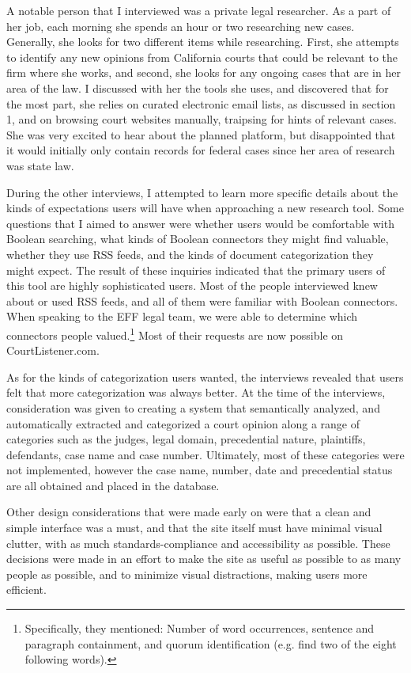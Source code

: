 A notable person that I interviewed was a private legal researcher. As a part of her job, each morning she spends an hour or two researching new cases. Generally, she looks for two different items while researching. First, she attempts to identify any new opinions from California courts that could be relevant to the firm where she works, and second, she looks for any ongoing cases that are in her area of the law. I discussed with her the tools she uses, and discovered that for the most part, she relies on curated electronic email lists, as discussed in section 1, and on browsing court websites manually, traipsing for hints of relevant cases. She was very excited to hear about the planned platform, but disappointed that it would initially only contain records for federal cases since her area of research was state law.

During the other interviews, I attempted to learn more specific details about the kinds of expectations users will have when approaching a new research tool. Some questions that I aimed to answer were whether users would be comfortable with Boolean searching, what kinds of Boolean connectors they might find valuable, whether they use RSS feeds, and the kinds of document categorization they might expect. The result of these inquiries indicated that the primary users of this tool are highly sophisticated users. Most of the people interviewed knew about or used RSS feeds, and all of them were familiar with Boolean connectors. When speaking to the EFF legal team, we were able to determine which connectors people valued.\footnote{Specifically, they mentioned: Number of word occurrences, sentence and paragraph containment, and quorum identification (e.g. find two of the eight following words).} Most of their requests are now possible on CourtListener.com.

As for the kinds of categorization users wanted, the interviews revealed that users felt that more categorization was always better. At the time of the interviews, consideration was given to creating a system that semantically analyzed, and automatically extracted and categorized a court opinion along a range of categories such as the judges, legal domain, precedential nature, plaintiffs, defendants, case name and case number. Ultimately, most of these categories were not implemented, however the case name, number, date and precedential status are all obtained and placed in the database.

Other design considerations that were made early on were that a clean and simple interface was a must, and that the site itself must have minimal visual clutter, with as much standards-compliance and accessibility as possible. These decisions were made in an effort to make the site as useful as possible to as many people as possible, and to minimize visual distractions, making users more efficient.

